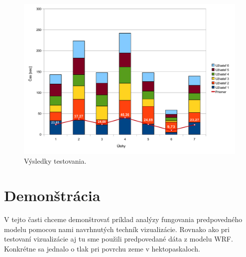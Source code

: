 



\begin{figure}
	\centering
	\includegraphics[width = 5in]{resultchart}
	\caption{Výsledky testovania.}
	\label{fig:results} 
\end{figure}

\section{Demonštrácia}
V tejto časti chceme demonštrovať príklad analýzy fungovania predpovedného modelu pomocou nami navrhnutých techník vizualizácie. Rovnako ako pri testovaní vizualizácie aj tu sme použili predpovedané dáta z modelu WRF. Konkrétne sa jednalo o tlak pri povrchu zeme v hektopaskaloch.

